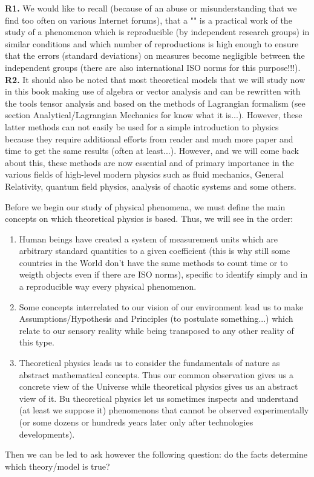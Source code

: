	\begin{tcolorbox}[title=Remarks,colframe=black,arc=10pt]
	\textbf{R1.} We would like to recall (because of an abuse or misunderstanding that we find too often on various Internet forums), that a "" is a practical work of the study of a phenomenon which is reproducible (by independent research groups) in similar conditions and which number of reproductions is high enough to ensure that the errors (standard deviations) on measures become negligible between the independent groups (there are also international ISO norms for this purpose!!!).\\
	
	\textbf{R2.} It should also be noted that most theoretical models that we will study now in this book making use of algebra or vector analysis and can be rewritten with the tools tensor analysis and based on the methods of Lagrangian formalism (see section Analytical/Lagrangian Mechanics for know what it is...). However, these latter methods can not easily be used for a simple introduction to physics because they require additional efforts from reader and much more paper and time to get the same results (often at least...). However, and we will come back about this, these methods are now essential and of primary importance in the various fields of high-level modern physics such as fluid mechanics, General Relativity, quantum field physics, analysis of chaotic systems and some others.
	\end{tcolorbox}	
	Before we begin our study of physical phenomena, we must define the main concepts on which theoretical physics is based. Thus, we will see in the order:
	\begin{enumerate}
		\item Human beings have created a system of measurement units which are arbitrary  standard quantities to a given coefficient (this is why still some countries in the World don't have the same methods to count time or to weigth objects even if there are ISO norms), specific to identify simply and in a reproducible way every physical phenomenon.
		
		\item Some concepts interrelated to our vision of our environment lead us to make Assumptions/Hypothesis and Principles (to postulate something...) which relate to our sensory reality while being transposed to any other reality of this type.
		
		\item Theoretical physics leads us to consider the fundamentals of nature as abstract mathematical concepts. Thus our common observation gives us a concrete view of the Universe while theoretical physics gives us an abstract view of it. Bu theoretical physics let us sometimes inspects and understand (at least we suppose it) phenomenons that cannot be observed  experimentally (or some dozens or hundreds years later only after technologies developments).
	\end{enumerate}
	Then we can be led to ask however the following question: do the facts determine which theory/model is true?
	
